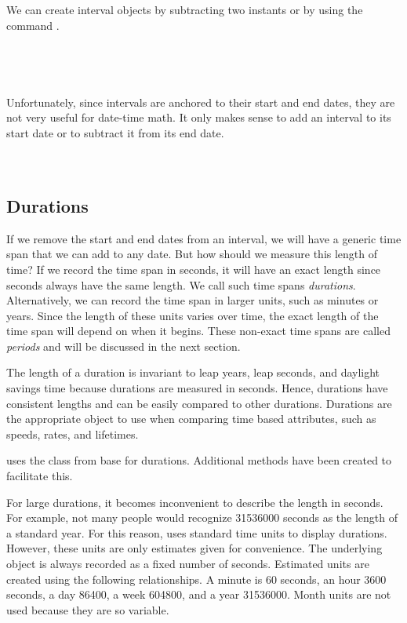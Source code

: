 \documentclass[article]{jss}
\begin{document}
We can create interval objects by subtracting two instants or by using the command .\\

\\
\\
\\
\\

Unfortunately, since intervals are anchored to their start and end dates, they are not very useful for date-time math. It only makes sense to add an interval to its start date or to subtract it from its end date.\\

\\
\\


\subsection{Durations}
\label{sec:durations}

If we remove the start and end dates from an interval, we will have a generic time span that we can add to any date. But how should we measure this length of time? If we record the time span in seconds, it will have an exact length since seconds always have the same length. We call such time spans \emph{durations}. Alternatively, we can record the time span in larger units, such as minutes or years. Since the length of these units varies over time, the exact length of the time span will depend on when it begins. These non-exact time spans are called \emph{periods} and will be discussed in the next section.

The length of a duration is invariant to leap years, leap seconds, and daylight savings time because durations are measured in seconds. Hence, durations have consistent lengths and can be easily compared to other durations. Durations are the appropriate object to use when comparing time based attributes, such as speeds, rates, and lifetimes.

 uses the  class from base  for durations. Additional  methods have been created to facilitate this. 

For large durations, it becomes inconvenient to describe the length in seconds. For example, not many people would recognize 31536000 seconds as the length of a standard year. For this reason,  uses standard time units to display durations. However, these units are only estimates given for convenience. The underlying object is always recorded as a fixed number of seconds. Estimated units are created using the following relationships. A minute is 60 seconds, an hour 3600 seconds, a day 86400, a week 604800, and a year 31536000. Month units are not used because they are so variable.
\end{document}
